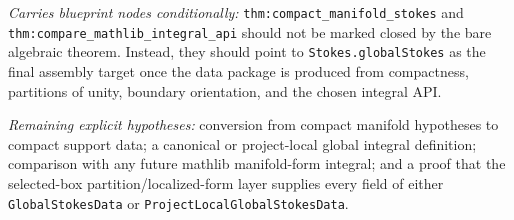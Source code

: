 \begin{theorem}
  \label{anc:remaining_final_global_nodes}
  \leanok
  \emph{Carries blueprint nodes conditionally:}
  \texttt{thm:compact\_manifold\_stokes} and
  \texttt{thm:compare\_mathlib\_integral\_api} should not be marked closed by
  the bare algebraic theorem.  Instead, they should point to
  \texttt{Stokes.globalStokes} as the final assembly target once the data
  package is produced from compactness, partitions of unity, boundary
  orientation, and the chosen integral API.

  \emph{Remaining explicit hypotheses:}
  conversion from compact manifold hypotheses to compact support data; a
  canonical or project-local global integral definition; comparison with any
  future mathlib manifold-form integral; and a proof that the selected-box
  partition/localized-form layer supplies every field of either
  \texttt{GlobalStokesData} or \texttt{ProjectLocalGlobalStokesData}.
\end{theorem}

\endgroup
